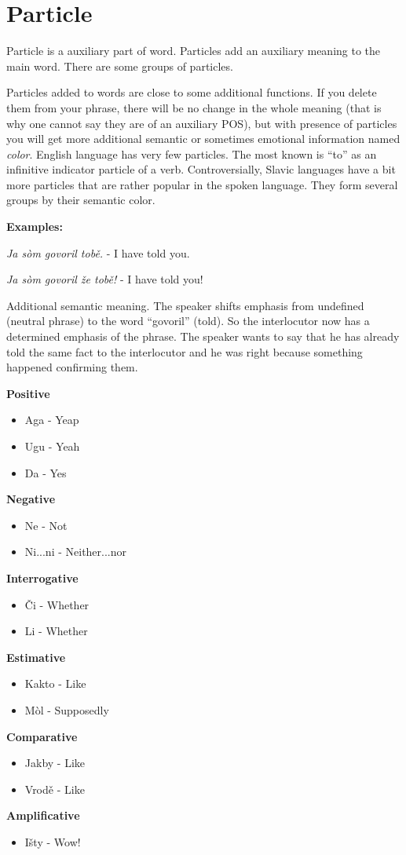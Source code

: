 \section{Particle}

Particle is a auxiliary part of word. Particles add an auxiliary meaning to the main word. There are some groups of particles.

Particles added to words are close to some additional functions. If you delete them from your phrase, there will be no change in the whole meaning (that is why one cannot say they are of an auxiliary POS), but with presence of particles you will get more additional semantic or sometimes emotional information named \textit{color}. English language has very few particles. The most known is “to” as an infinitive indicator particle of a verb. Controversially, Slavic languages have a bit more particles that are rather popular in the spoken language. They form several groups by their semantic color.

\textbf{Examples:}

\textit{Ja sòm govoril tobě.} - I have told you.

\textit{Ja sòm govoril že tobě!} - I have told you!

Additional semantic meaning. The speaker shifts emphasis from undefined (neutral phrase) to the word “govoril” (told). So the interlocutor now has a determined emphasis of the phrase. The speaker wants to say that he has already told the same fact to the interlocutor and he was right because something happened confirming them.

\textbf{Positive}

\begin{itemize}
	\item Aga - Yeap
	\item Ugu - Yeah
	\item Da - Yes
\end{itemize}

\textbf{Negative}

\begin{itemize}
	\item Ne - Not
	\item Ni...ni - Neither...nor
\end{itemize}

\textbf{Interrogative}

\begin{itemize}
	\item Či - Whether
	\item Li - Whether
\end{itemize}

\textbf{Estimative}

\begin{itemize}
	\item Kakto - Like
	\item Mòl - Supposedly
\end{itemize}

\textbf{Comparative}

\begin{itemize}
	\item Jakby - Like
	\item Vrodě - Like
\end{itemize}

\textbf{Amplificative}

\begin{itemize}
	\item Išty - Wow!
\end{itemize}



